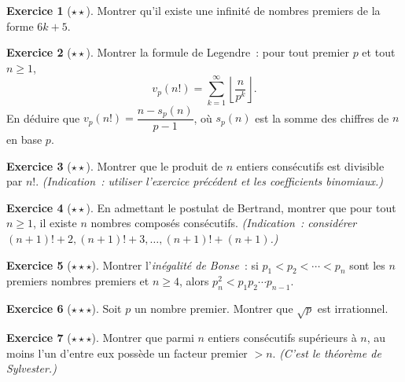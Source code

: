 \documentclass[12pt,a4paper,openany]{book}
\theoremstyle{definition}
\newtheorem{exercice}{Exercice}[chapter]
\theoremstyle{plain}
\theoremstyle{remark}
\newcommand{\floor}[1]{\left\lfloor #1 \right\rfloor}
\begin{document}
\begin{exercice}[$\star\star$]
\label{exo:ch2:infinitude_6k5}
Montrer qu'il existe une infinité de nombres premiers de la forme $6k + 5$.
\end{exercice}

\begin{exercice}[$\star\star$]
\label{exo:ch2:valuation}
Montrer la formule de Legendre~:
pour tout premier $p$ et tout $n \geq 1$,
\[
  v_p(n!) = \sum_{k=1}^{\infty} \floor{\frac{n}{p^k}}.
\]
En déduire que $v_p(n!) = \dfrac{n - s_p(n)}{p - 1}$, où $s_p(n)$ est la somme des
chiffres de $n$ en base $p$.
\end{exercice}

\begin{exercice}[$\star\star$]
\label{exo:ch2:produit_consecutifs}
Montrer que le produit de $n$ entiers consécutifs est divisible par $n!$.
\textit{(Indication~: utiliser l'exercice précédent et les coefficients binomiaux.)}
\end{exercice}

\begin{exercice}[$\star\star$]
\label{exo:ch2:bertrand}
En admettant le postulat de Bertrand, montrer que pour tout $n \geq 1$, il existe
$n$ nombres composés consécutifs. \textit{(Indication~: considérer $(n+1)! + 2,
(n+1)! + 3, \ldots, (n+1)! + (n+1)$.)}
\end{exercice}

\begin{exercice}[$\star\star\star$]
\label{exo:ch2:bonse}
Montrer l'\emph{inégalité de Bonse}~: si $p_1 < p_2 < \cdots < p_n$ sont les $n$
premiers nombres premiers et $n \geq 4$, alors $p_n^2 < p_1 p_2 \cdots p_{n-1}$.
\end{exercice}

\begin{exercice}[$\star\star\star$]
\label{exo:ch2:olympiade1}
Soit $p$ un nombre premier. Montrer que $\sqrt{p}$ est irrationnel.
\end{exercice}

\begin{exercice}[$\star\star\star$]
\label{exo:ch2:olympiade2}
Montrer que parmi $n$ entiers consécutifs supérieurs à $n$, au moins l'un d'entre eux
possède un facteur premier $> n$. \textit{(C'est le théorème de
Sylvester.)}
\end{exercice}
\end{document}
